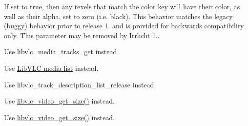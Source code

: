 \begin{DoxyRefList}
If set to true, then any texels that match the color key will have their color, as well as their alpha, set to zero (i.\+e. black). This behavior matches the legacy (buggy) behavior prior to release 1. and is provided for backwards compatibility only. This parameter may be removed by Irrlicht 1..  
\item[\label{deprecated__deprecated000054}%
\Hypertarget{deprecated__deprecated000054}%
Member \hyperlink{group__libvlc__media_ga2102c151df0ab66d6158a80b7734f0f9}{libvlc\+\_\+media\+\_\+get\+\_\+tracks\+\_\+info} (libvlc\+\_\+media\+\_\+t $\ast$p\+\_\+md, libvlc\+\_\+media\+\_\+track\+\_\+info\+\_\+t $\ast$$\ast$tracks)]Use libvlc\+\_\+media\+\_\+tracks\+\_\+get instead 
\item[\label{deprecated__deprecated000053}%
\Hypertarget{deprecated__deprecated000053}%
Module \hyperlink{group__libvlc__playlist}{libvlc\+\_\+playlist} ]Use \hyperlink{group__libvlc__media__list}{Lib\+V\+LC media list} instead.


\item[\label{deprecated__deprecated000055}%
\Hypertarget{deprecated__deprecated000055}%
Member \hyperlink{group__libvlc__media__player_ga952b5c8fffa72a993f0ea61bf5b5711c}{libvlc\+\_\+track\+\_\+description\+\_\+release} (\hyperlink{structlibvlc__track__description__t}{libvlc\+\_\+track\+\_\+description\+\_\+t} $\ast$p\+\_\+track\+\_\+description)]Use libvlc\+\_\+track\+\_\+description\+\_\+list\+\_\+release instead  
\item[\label{deprecated__deprecated000056}%
\Hypertarget{deprecated__deprecated000056}%
Member \hyperlink{group__libvlc__video_gaacb14ac1ff0ec4fa8e47de4a57ebd7a3}{libvlc\+\_\+video\+\_\+get\+\_\+height} (libvlc\+\_\+media\+\_\+player\+\_\+t $\ast$p\+\_\+mi)]Use \hyperlink{group__libvlc__video_ga3cb7efa452da1f718013da0f169396a7}{libvlc\+\_\+video\+\_\+get\+\_\+size()} instead. 
\item[\label{deprecated__deprecated000057}%
\Hypertarget{deprecated__deprecated000057}%
Member \hyperlink{group__libvlc__video_gad585bfac7ed2b59f2e84c43e6459a76a}{libvlc\+\_\+video\+\_\+get\+\_\+width} (libvlc\+\_\+media\+\_\+player\+\_\+t $\ast$p\+\_\+mi)]Use \hyperlink{group__libvlc__video_ga3cb7efa452da1f718013da0f169396a7}{libvlc\+\_\+video\+\_\+get\+\_\+size()} instead.
\end{DoxyRefList}